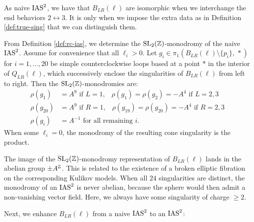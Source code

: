 \documentclass[table,x11names]{amsart}
\begin{document}
 \begin{remark} As naive $\operatorname{IAS}^2$, we have that $B_{LR}(\ell)$ are isomorphic
 when we interchange the end behaviors $2\leftrightarrow 3$.
 It is only when we impose the extra data as in Definition \ref{def:true-sing}
 that we can distinguish them.\end{remark}
 
From Definition \ref{def:rc-ias}, we determine the $\operatorname{SL}_2(\mathbb{Z})$-monodromy
of the naive $\operatorname{IAS}^2$. Assume for convenience that all $\ell_i>0$.
Let $g_i\in \pi_1(B_{LR}(\ell) \setminus \{p_i\},\,*)$ for $i=1,\dots,20$ be simple 
counterclockwise loops 
based at a point $*$ in the interior of $Q_{LR}(\ell)$,
which successively enclose the singularities of $B_{LR}(\ell)$ from left to
right. Then the $\operatorname{SL}_2(\mathbb{Z})$-monodromies
are: 
\begin{align*} 
  \rho(g_1) &= A^9 \textrm{ if }L=1,\hspace{10pt}
              \rho(g_1)=\rho(g_2) = -A^4\textrm{ if }L=2,3 \\
  \rho(g_{20}) 
            &= A^9\textrm{ if }R=1, \hspace{10pt}
              \rho(g_{19})=\rho(g_{20}) = -A^4\textrm{ if }R=2,3 \\
  \rho(g_i)&=A^{-1}\textrm{ for all remaining }i.
\end{align*}
When some $\ell_i=0$,
the monodromy of the resulting cone singularity is the product.


\begin{remark} 
  The image of the $\operatorname{SL}_2(\mathbb{Z})$-monodromy representation of
  $B_{LR}(\ell)$ lands in the abelian group $\pm A^{\mathbb{Z}}$. This is
  related to the existence of a broken elliptic fibration on the
  corresponding Kulikov models.  When all $24$ singularities are
  distinct, the monodromy of an $\operatorname{IAS}^2$ is never abelian, because the
  sphere would then admit a non-vanishing vector field. Here, we
  always have some singularity of charge $\ge2$. 
\end{remark}

Next, we enhance $B_{LR}(\ell)$ from a naive $\operatorname{IAS}^2$ to 
an $\operatorname{IAS}^2$:
\end{document}
